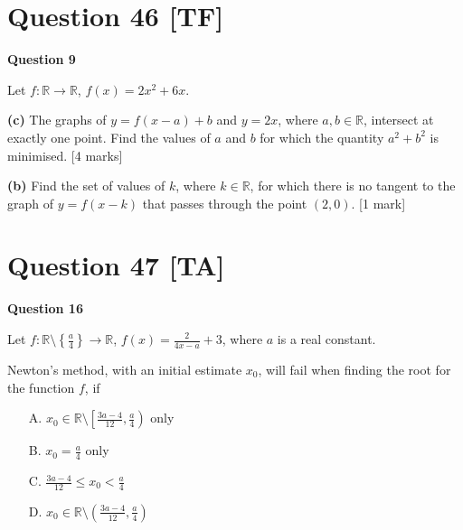 \documentclass[10pt,a4paper]{article}
\begin{document}
\vspace{9\baselineskip}

\hrulefill

\section*{Question 46 [TF]}

\textbf{Question 9}

Let $f : \mathbb{R} \to \mathbb{R}$, $f(x) = 2x^2 + 6x$.

\textbf{(c)} The graphs of $y = f(x - a) + b$ and $y = 2x$, where $a, b \in \mathbb{R}$, intersect at exactly one point. Find the values of $a$ and $b$ for which the quantity $a^2 + b^2$ is minimised. \hfill [4 marks]

\vspace{9\baselineskip}

\textbf{(b)} Find the set of values of $k$, where $k \in \mathbb{R}$, for which there is no tangent to the graph of $y = f(x - k)$ that passes through the point $(2,0)$. \hfill [1 mark]

\vspace{9\baselineskip}

\hrulefill

\section*{Question 47 [TA]}

\textbf{Question 16}

Let $f : \mathbb{R} \setminus \left\{\frac{a}{4}\right\} \to \mathbb{R}$, $f(x) = \frac{2}{4x-a} + 3$, where $a$ is a real constant.

Newton's method, with an initial estimate $x_0$, will fail when finding the root for the function $f$, if

\begin{enumerate}
    \item[A.] $x_0 \in \mathbb{R} \setminus \left[\frac{3a-4}{12}, \frac{a}{4}\right)$ only
    \item[B.] $x_0 = \frac{a}{4}$ only
    \item[C.] $\frac{3a-4}{12} \leq x_0 < \frac{a}{4}$
    \item[D.] $x_0 \in \mathbb{R} \setminus \left(\frac{3a-4}{12}, \frac{a}{4}\right)$
\end{enumerate}

\vspace{9\baselineskip}
\end{document}
